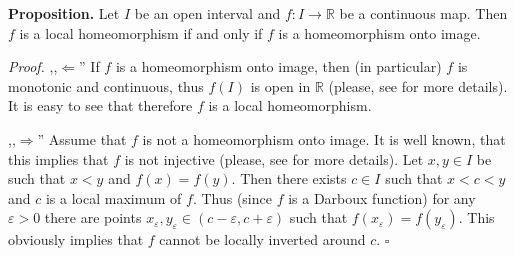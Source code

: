 \documentclass[12pt]{article}
\begin{document}
\textbf{Proposition.} Let $I$ be an open interval and $f:I\to\mathbb{R}$ be a continuous map. Then $f$ is a local homeomorphism if and only if $f$ is a homeomorphism onto image.

\textit{Proof.} ,,$\Leftarrow$'' If $f$ is a homeomorphism onto image, then (in particular) $f$ is monotonic and continuous, thus $f(I)$ is open in $\mathbb{R}$ (please, see  for more details). It is easy to see that therefore $f$ is a local homeomorphism.

,,$\Rightarrow$'' Assume that $f$ is not a homeomorphism onto image. It is well known, that this implies that $f$ is not injective (please, see  for more details). Let $x,y\in I$ be such that $x<y$ and $f(x)=f(y)$. Then there exists $c\in I$ such that $x<c<y$ and $c$ is a local maximum of $f$. Thus (since $f$ is a Darboux function) for any $\varepsilon>0$ there are points $x_{\varepsilon}, y_{\varepsilon}\in(c-\varepsilon,c+\varepsilon)$ such that $f(x_{\varepsilon})=f(y_{\varepsilon})$. This obviously implies that $f$ cannot be locally inverted around $c$. $\square$
\end{document}
